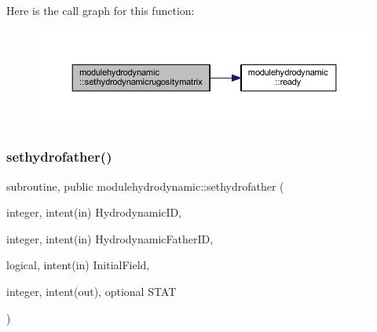 Here is the call graph for this function\+:\nopagebreak
\begin{figure}[H]
\begin{center}
\leavevmode
\includegraphics[width=350pt]{namespacemodulehydrodynamic_abf6161f88fc2f65b07d9f8764a501633_cgraph}
\end{center}
\end{figure}
\mbox{\label{namespacemodulehydrodynamic_abc9bf4137583800ad278abc052b5de37}} 
\subsubsection{\texorpdfstring{sethydrofather()}{sethydrofather()}}
{\footnotesize\ttfamily subroutine, public modulehydrodynamic\+::sethydrofather (\begin{DoxyParamCaption}\item[{integer, intent(in)}]{Hydrodynamic\+ID,  }\item[{integer, intent(in)}]{Hydrodynamic\+Father\+ID,  }\item[{logical, intent(in)}]{Initial\+Field,  }\item[{integer, intent(out), optional}]{S\+T\+AT }\end{DoxyParamCaption})}


